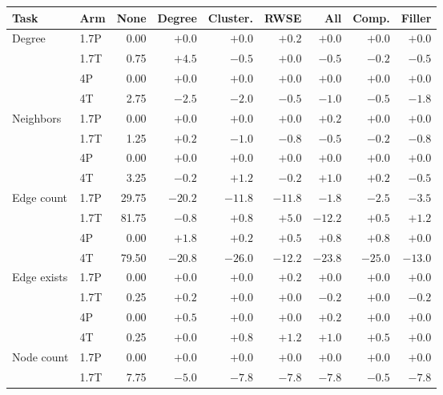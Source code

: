 \begin{table}[t]
\centering\scriptsize
\setlength{\tabcolsep}{3.4pt}
\begin{tabular}{llrrrrrrr}
\toprule
Task & Arm & None & Degree & Cluster. & RWSE & All & Comp. & Filler\\
\midrule
Degree & 1.7P & 0.00 & $+0.0$ & $+0.0$ & $+0.2$ & $+0.0$ & $+0.0$ & $+0.0$\\ %
 & 1.7T & 0.75 & $+4.5$ & $-0.5$ & $+0.0$ & $-0.5$ & $-0.2$ & $-0.5$\\ %
 & 4P & 0.00 & $+0.0$ & $+0.0$ & $+0.0$ & $+0.0$ & $+0.0$ & $+0.0$\\ %
 & 4T & 2.75 & $-2.5$ & $-2.0$ & $-0.5$ & $-1.0$ & $-0.5$ & $-1.8$\\ %
\addlinespace[2pt]
Neighbors & 1.7P & 0.00 & $+0.0$ & $+0.0$ & $+0.0$ & $+0.2$ & $+0.0$ & $+0.0$\\ %
 & 1.7T & 1.25 & $+0.2$ & $-1.0$ & $-0.8$ & $-0.5$ & $-0.2$ & $-0.8$\\ %
 & 4P & 0.00 & $+0.0$ & $+0.0$ & $+0.0$ & $+0.0$ & $+0.0$ & $+0.0$\\ %
 & 4T & 3.25 & $-0.2$ & $+1.2$ & $-0.2$ & $+1.0$ & $+0.2$ & $-0.5$\\ %
\addlinespace[2pt]
Edge count & 1.7P & 29.75 & $-20.2$ & $-11.8$ & $-11.8$ & $-1.8$ & $-2.5$ & $-3.5$\\ %
 & 1.7T & 81.75 & $-0.8$ & $+0.8$ & $+5.0$ & $-12.2$ & $+0.5$ & $+1.2$\\ %
 & 4P & 0.00 & $+1.8$ & $+0.2$ & $+0.5$ & $+0.8$ & $+0.8$ & $+0.0$\\ %
 & 4T & 79.50 & $-20.8$ & $-26.0$ & $-12.2$ & $-23.8$ & $-25.0$ & $-13.0$\\ %
\addlinespace[2pt]
Edge exists & 1.7P & 0.00 & $+0.0$ & $+0.0$ & $+0.2$ & $+0.0$ & $+0.0$ & $+0.0$\\ %
 & 1.7T & 0.25 & $+0.2$ & $+0.0$ & $+0.0$ & $-0.2$ & $+0.0$ & $-0.2$\\ %
 & 4P & 0.00 & $+0.5$ & $+0.0$ & $+0.0$ & $+0.2$ & $+0.0$ & $+0.0$\\ %
 & 4T & 0.25 & $+0.0$ & $+0.8$ & $+1.2$ & $+1.0$ & $+0.5$ & $+0.0$\\ %
\midrule
Node count & 1.7P & 0.00 & $+0.0$ & $+0.0$ & $+0.0$ & $+0.0$ & $+0.0$ & $+0.0$\\ %
 & 1.7T & 7.75 & $-5.0$ & $-7.8$ & $-7.8$ & $-7.8$ & $-0.5$ & $-7.8$\\ %

\end{tabular}
\end{table}

